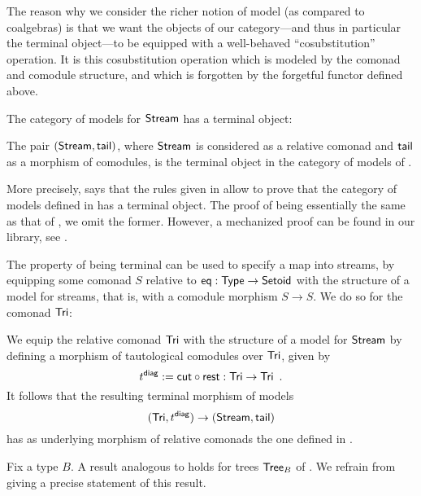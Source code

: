\documentclass[a4paper,USenglish]{lipics}
\begin{document}
  The reason why we consider the richer notion of model (as compared to coalgebras) is that we want the objects of 
  our category---and thus in particular the terminal object---to be equipped with a well-behaved \enquote{cosubstitution} operation.
  It is this cosubstitution operation which is modeled by the comonad and comodule structure, and which is forgotten by 
  the forgetful functor defined above.

  
  The category of models for $\mathsf{Stream}$ has a terminal object:
  
\begin{thm}\label{thm_stream_terminal}
 The pair $(\mathsf{Stream}, \mathsf{tail})$, where $\mathsf{Stream}$ is considered as a relative comonad and $\mathsf{tail}$ as
 a morphism of comodules, is the terminal object in the category of models of .
\end{thm}

\begin{Long}
More precisely,  says that the rules given in  allow to prove that
the category of models defined in  has a terminal object.
The proof of  being essentially the same as that of , we omit the former.
However, a mechanized proof can be found in our \coq library, see .
\end{Long}


The property of being terminal can be used to specify a map into streams, by equipping some comonad $S$ relative to $\mathsf{eq}:\mathsf{Type}\to\mathsf{Setoid}$
with the structure of a model for streams, that is, with a comodule morphism $S\to S$.
We do so for the comonad $\mathsf{Tri}$:

\begin{ex}
  We equip the relative comonad $\mathsf{Tri}$ with the structure of a model for $\mathsf{Stream}$ by defining a 
  morphism of tautological comodules over $\mathsf{Tri}$, given by
   \[ t^{\mathsf{diag}} := {\mathsf{cut}} \circ {\ensuremath{\mathsf{rest}}}  : \mathsf{Tri} \to \mathsf{Tri} \enspace . \]
  It follows that the resulting terminal morphism of models
   \[(\mathsf{Tri}, t^{\mathsf{diag}}) \to (\mathsf{Stream}, \mathsf{tail})\] has as underlying morphism of relative comonads the one defined in .
\end{ex}

\begin{Long}
 
\begin{rem}
 Fix a type $B$. A result analogous to  holds for trees $\mathsf{Tree}_B$ of . 
 We refrain from giving a precise statement of this result.
\end{rem}

\end{Long}
\end{document}
